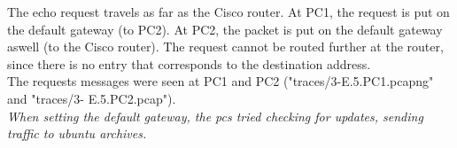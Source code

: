 The echo request travels as far as the Cisco router. At PC1, the request is put on the
default gateway (to PC2). At PC2, the packet is put on the default gateway aswell (to the Cisco router). The request cannot be routed further at the router, since there is no entry
that corresponds to the destination address. \\
The requests messages were seen at PC1 and PC2 ("traces/3-E.5.PC1.pcapng" and "traces/3-
E.5.PC2.pcap"). \\
\textit{When setting the default gateway, the pcs tried checking for updates, sending traffic to ubuntu archives.}